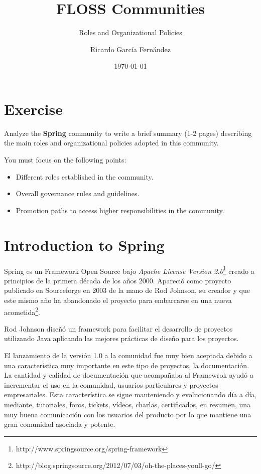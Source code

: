 \documentclass[11pt]{scrartcl}
\title{\textbf{FLOSS Communities}}
\subtitle{Roles and Organizational Policies}
\author{Ricardo Garc\'ia Fern\'andez}
\date{\today}
\begin{document}
\maketitle

\section{Exercise}

Analyze the \textbf{Spring} community to write a brief summary (1-2 pages) describing the main roles and organizational policies adopted in this community.

You must focus on the following points:

\begin{itemize}
    \item Different roles established in the community.
    \item Overall governance rules and guidelines.
    \item Promotion paths to access higher responsibilities in the community.
\end{itemize}

\section{Introduction to Spring}

Spring es un Framework Open Source bajo \emph{Apache License Version 2.0}\footnote{http://www.springsource.org/spring-framework} creado a principios de la primera d\'ecada de los a\~nos 2000. Apareci\'o como proyecto publicado en Sourceforge en 2003 de la mano de Rod Johnson, su creador y que este mismo a\~no ha abandonado el proyecto para embarcarse en una nueva acometida\footnote{http://blog.springsource.org/2012/07/03/oh-the-places-youll-go/}.

Rod Johnson dise\~n\'o un framework para facilitar el desarrollo de proyectos utilizando Java aplicando las mejores pr\'acticas de dise\~no para los proyectos.

El lanzamiento de la versi\'on 1.0 a la comunidad fue muy bien aceptada debido a una caracter\'istica muy importante en este tipo de proyectos, la documentaci\'on. La cantidad y calidad de documentaci\'on que acompa\~naba al Framewrok ayud\'o a incrementar el uso en la comunidad, usuarios particulares y proyectos empresariales.
Esta caracter\'istica se sigue manteniendo y evolucionando d\'ia a d\'ia, mediante, tutoriales, foros, tickets, v\'ideos, charlas, certificados, en resumen, una muy buena comunicaci\'on con los usuarios del producto por lo que mantiene una gran comunidad asociada y potente.
\end{document}
